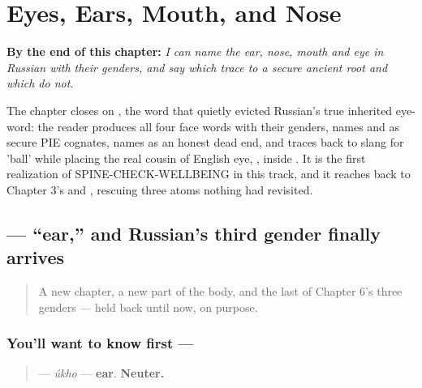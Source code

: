 
\chapter{Eyes, Ears, Mouth, and Nose}
\label{ch:russian-face-parts}

\begin{chapteropening}
\textbf{By the end of this chapter:} \emph{I can name the ear, nose, mouth and eye in Russian with their genders, and say which trace to a secure ancient root and which do not.}

The chapter closes on , the word that quietly evicted Russian's true inherited eye-word: the reader produces all four face words with their genders, names  and  as secure PIE cognates, names  as an honest dead end, and traces  back to slang for 'ball' while placing the real cousin of English eye, , inside . It is the first realization of SPINE-CHECK-WELLBEING in this track, and it reaches back to Chapter 3's  and , rescuing three atoms nothing had revisited.
\end{chapteropening}

\section[\texorpdfstring{\ru{ухо} (úkho)}{ухо (úkho)}]{ — \textquotedblleft{}ear,\textquotedblright{} and Russian's third gender finally arrives}

\label{lesson:RU-C09-ukho}



\begin{quote}
A new chapter, a new part of the body, and the last of Chapter 6's three genders — held back until now, on purpose.
\end{quote}

\subsection*{You'll want to know first — }
\begin{quote}
\textbf{} — \emph{úkho} — \textbf{ear}. \textbf{Neuter.}
\end{quote}

